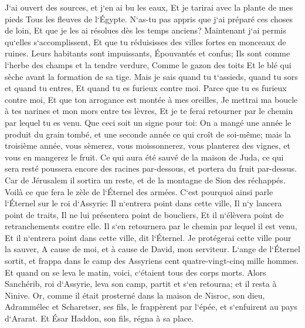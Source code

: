 \verse J`ai ouvert des sources, et j`en ai bu les eaux, Et je tarirai avec la plante de mes pieds Tous les fleuves de l`Égypte. 
\verse N`as-tu pas appris que j`ai préparé ces choses de loin, Et que je les ai résolues dès les temps anciens? Maintenant j`ai permis qu`elles s`accomplissent, Et que tu réduisisses des villes fortes en monceaux de ruines. 
\verse Leurs habitants sont impuissants, Épouvantés et confus; Ils sont comme l`herbe des champs et la tendre verdure, Comme le gazon des toits Et le blé qui sèche avant la formation de sa tige. 
\verse Mais je sais quand tu t`assieds, quand tu sors et quand tu entres, Et quand tu es furieux contre moi. 
\verse Parce que tu es furieux contre moi, Et que ton arrogance est montée à mes oreilles, Je mettrai ma boucle à tes narines et mon mors entre tes lèvres, Et je te ferai retourner par le chemin par lequel tu es venu. 
\verse Que ceci soit un signe pour toi: On a mangé une année le produit du grain tombé, et une seconde année ce qui croît de soi-même; mais la troisième année, vous sèmerez, vous moissonnerez, vous planterez des vignes, et vous en mangerez le fruit. 
\verse Ce qui aura été sauvé de la maison de Juda, ce qui sera resté poussera encore des racines par-dessous, et portera du fruit par-dessus. 
\verse Car de Jérusalem il sortira un reste, et de la montagne de Sion des réchappés. Voilà ce que fera le zèle de l`Éternel des armées. 
\verse C`est pourquoi ainsi parle l`Éternel sur le roi d`Assyrie: Il n`entrera point dans cette ville, Il n`y lancera point de traits, Il ne lui présentera point de boucliers, Et il n`élèvera point de retranchements contre elle. 
\verse Il s`en retournera par le chemin par lequel il est venu, Et il n`entrera point dans cette ville, dit l`Éternel. 
\verse Je protégerai cette ville pour la sauver, A cause de moi, et à cause de David, mon serviteur. 
\verse L`ange de l`Éternel sortit, et frappa dans le camp des Assyriens cent quatre-vingt-cinq mille hommes. Et quand on se leva le matin, voici, c`étaient tous des corps morts. 
\verse Alors Sanchérib, roi d`Assyrie, leva son camp, partit et s`en retourna; et il resta à Ninive. 
\verse Or, comme il était prosterné dans la maison de Nisroc, son dieu, Adrammélec et Scharetser, ses fils, le frappèrent par l`épée, et s`enfuirent au pays d`Ararat. Et Ésar Haddon, son fils, régna à sa place. 

